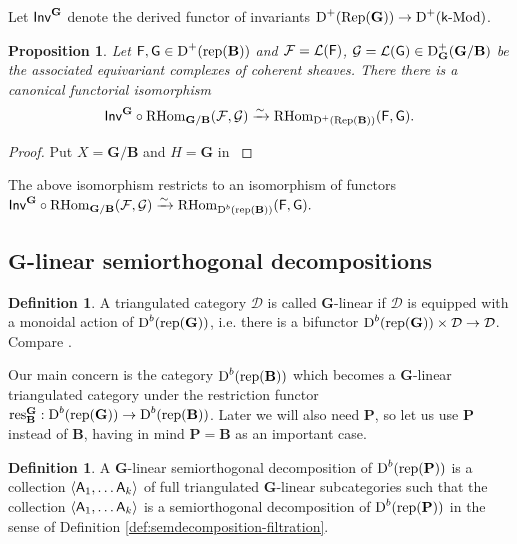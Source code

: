 \documentclass[sn-mathphys-num]{sn-jnl}%
\newcommand{\Ff}{\mathcal F}
\newcommand{\Ll}{\mathcal L}
\newcommand{\D}{\mathcal D}
\newcommand{\rep}{{\mathrm{rep}}}
\newcommand{\res}{{\mathrm{res}}}
\newcommand{\Rep}{{\mathrm{Rep}}}
\newcommand*{\Dd}{\mathop{\mathrm D\kern0pt}\nolimits}
\newcommand*{\RHom}{\mathop{\mathrm {RHom}}\nolimits}
\newcommand{\sk}{{\sf k}}
\newcommand{\kMod}{\sk\textrm{-}\mathrm{Mod}}
\newcommand{\bg}{\mathbf G}
\newcommand{\fb}{\mathbf B}
\newcommand{\bp}{\mathbf P}
\newtheorem{proposition}[theorem]{Proposition}
\theoremstyle{definition}
\newtheorem{definition}[theorem]{Definition}%
\begin{document}
Let ${\sf Inv}^{ \bg}$ denote the derived functor of invariants $\Dd ^+(\Rep( \bg))\rightarrow \Dd ^+(\kMod)$.

\begin{proposition}\label{prop:derived_B-cohomology}
Let ${\sf F},{\sf G}\in \Dd ^+(\rep( \fb))$ and $\Ff=\Ll ({\sf F})$, ${\mathcal G}=\Ll ({\sf G})\in \Dd ^+_{ \bg}( \bg/ \fb)$ be the associated equivariant complexes of coherent sheaves. There there is a canonical functorial isomorphism
$$
{\sf Inv}^{ \bg}\circ \RHom _{ \bg/\fb}(\Ff,\mathcal G)\xrightarrow{\sim} \RHom _{\Dd ^+(\Rep( \fb))}({\sf F},{\sf G}).
$$
\end{proposition}

\begin{proof}
Put $X= \bg/ \fb$ and $ H= \bg$ in \cite[Appendix, Proposition A.6]{MR}
\end{proof}

The above isomorphism restricts to an isomorphism of functors ${\sf Inv}^{ \bg}\circ \RHom _{ \bg/\fb}(\Ff,\mathcal G)\xrightarrow{\sim} \RHom _{\Dd ^b(\rep( \fb))}({\sf F},{\sf G}).$

\subsection{$ \bg$-linear semiorthogonal decompositions}\label{subsec:G-linear-sod}

\begin{definition}\label{def:G-linear-cat}
A triangulated category $\D$ is called $ \bg$-linear if $\D$ is equipped with a monoidal action of $\Dd ^b(\rep( \bg))$, i.e. there is a bifunctor $\Dd ^b(\rep( \bg))\times \D\rightarrow \D$. Compare \cite[Section 2.7]{KuzHPD}.
\end{definition}

Our main concern is the category $\Dd ^b(\rep( \fb))$ which becomes a $ \bg$-linear triangulated category under the restriction functor $\res_{\fb}^{ \bg}:\Dd ^b(\rep( \bg))\rightarrow \Dd ^b(\rep( \fb))$.
Later we will also need $\bp$, so let us use $\bp$ instead of $\fb$, having in mind $\bp=\fb$ as an important case.

\begin{definition}\label{def:G-linear-SOD}
A $ \bg$-linear semiorthogonal decomposition of $\Dd^b(\rep ( \bp))$ is a collection $\langle {\sf A}_1,\dots {\sf A}_k\rangle$ of full triangulated $ \bg$-linear subcategories such that the collection $\langle {\sf A}_1,\dots {\sf A}_k\rangle$ is a semiorthogonal decomposition of $\Dd^b(\rep ( \bp))$ in the sense of Definition \ref{def:semdecomposition-filtration}.
\end{definition}
\end{document}
